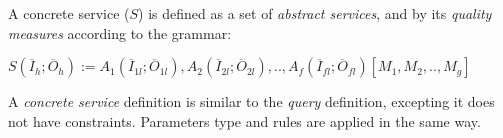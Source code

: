 \begin{definition}
A concrete service ($S$) is defined as a set of 
\textit{abstract services}, and by its \textit{quality measures} according to the grammar:
%
\begin{center}
\begin{math}
S (\overline{I}_{h}; \overline{O}_{h}) := A_{1}(\overline{I}_{1l}; \overline{O}_{1l}), A_{2}(\overline{I}_{2l}; \overline{O}_{2l}), ..,  A_{f}(\overline{I}_{fl}; \overline{O}_{fl})[M_{1},M_{2}, ..,M_{g}]
\end{math}
\end{center}
%
%
A \textit{concrete service} definition is similar to the \textit{query} definition, excepting it does not have constraints. Parameters type and rules are applied in the same way.
%
%
%
%
%
%

\end{definition}
